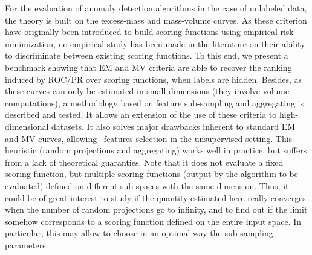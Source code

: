 For the evaluation of anomaly detection algorithms in the case of unlabeled data, the theory is built on the excess-mass and mass-volume curves.
%
As these criterion have originally been introduced to build scoring functions using empirical risk minimization, no empirical study has been made in the literature on their ability to discriminate between existing scoring functions. %
To this end, we present a benchmark showing that EM and MV criteria are able to recover the ranking induced by ROC/PR over scoring functions, when labels are hidden.
Besides, as these curves can only be estimated in small dimensions (they involve volume computations), a methodology based on feature sub-sampling and aggregating is described and tested. It allows an extension of the use of these criteria to high-dimensional datasets. It also solves major drawbacks inherent to standard EM and MV curves, allowing \eg~features selection in the unsupervised setting.
%
This heuristic (random projections and aggregating) works well in practice, but suffers from a lack of theoretical guaranties. Note that it does not evaluate a fixed scoring function, but multiple scoring functions (output by the algorithm to be evaluated) defined on different sub-spaces with the same dimension. 
Thus, it could be of great interest to study if the quantity estimated here really converges when the number of random projections go to infinity, and to find out if the limit somehow corresponds to a scoring function defined on the entire input space. In particular, this may allow to choose in an optimal way the sub-sampling parameters.






